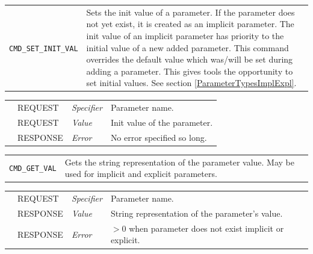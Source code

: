 \vspace{1 cm}

\noindent
\begin{tabularx}{\textwidth}{|p{3.6cm}|X|}
	\cline{1-1}\cline{2-2}
	  \lstinline|CMD_SET_INIT_VAL| & Sets the init value of a parameter. If the parameter does not yet exist, it is created as an implicit parameter. The init value of an implicit parameter has priority to the initial value of a new added parameter. This command overrides the default value which was/will be set during adding a parameter. This gives tools the opportunity to set initial values. See section \ref{ParameterTypesImplExpl}. \\
\end{tabularx}
\begin{tabularx}{\textwidth}{|p{3.6cm}|p{2.3cm}|p{2cm}|X|}
	\cline{1-1}\cline{2-2}\cline{3-3}\cline{4-4}
	   &  REQUEST     &  {\em Specifier}   &  Parameter name.   \\
	\cline{1-1}\cline{2-2}\cline{3-3}\cline{4-4}                        &  REQUEST     &  {\em Value}     &  Init value of the parameter.   \\
	\cline{1-1}\cline{2-2}\cline{3-3}\cline{4-4}                        &  RESPONSE    &  {\em Error}    &  No error specified so long.\\
	\hline
\end{tabularx}

\vspace{1 cm}

\noindent
\begin{tabularx}{\textwidth}{|p{3.6cm}|X|}
	\cline{1-1}\cline{2-2}
	  \lstinline|CMD_GET_VAL| & Gets the string representation of the parameter value. May be used for implicit and explicit parameters.\\
\end{tabularx}
\begin{tabularx}{\textwidth}{|p{3.6cm}|p{2.3cm}|p{2cm}|X|}
	\cline{1-1}\cline{2-2}\cline{3-3}\cline{4-4}
	  &  REQUEST     &  {\em Specifier}   &  Parameter name.   \\
	\cline{1-1}\cline{2-2}\cline{3-3}\cline{4-4}                        &  RESPONSE    &  {\em Value} &  String representation of the parameter's value.   \\
	\cline{1-1}\cline{2-2}\cline{3-3}\cline{4-4}                        &  RESPONSE    &  {\em Error}  &  $>0$ when parameter does not exist implicit or explicit.   \\
	\hline
\end{tabularx}

